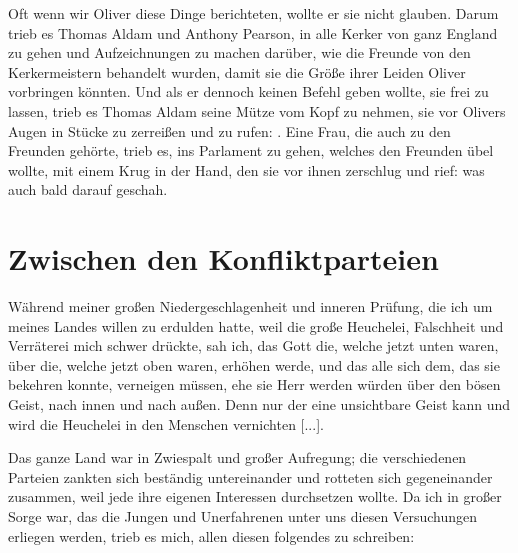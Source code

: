 Oft wenn wir Oliver diese 
Dinge berichteten, wollte er sie nicht
glauben. Darum trieb es Thomas Aldam 
und Anthony Pearson,
in alle Kerker von ganz England zu gehen und Aufzeichnungen
zu machen darüber, wie die Freunde von den Kerkermeistern
behandelt wurden, damit sie die Größe ihrer Leiden Oliver 
vorbringen könnten. Und als er dennoch keinen Befehl geben wollte,
sie frei zu lassen, trieb es Thomas Aldam seine Mütze vom Kopf
zu nehmen, sie vor Olivers Augen in Stücke zu zerreißen und zu
rufen: . Eine Frau, die auch zu den Freunden 
gehörte, trieb es, ins Parlament zu gehen, welches den Freunden
übel wollte, mit einem Krug in der Hand, den sie vor ihnen 
zerschlug und rief:  was auch bald darauf geschah. 

\section{Zwischen den Konfliktparteien}

Während meiner großen 
Niedergeschlagenheit 
und inneren Prüfung, die ich um meines Landes willen
zu erdulden hatte, weil die große Heuchelei, Falschheit und 
Verräterei mich schwer drückte, sah ich, das Gott die, welche jetzt
unten waren, über die, welche jetzt oben waren, erhöhen werde,
und das alle sich dem, das sie bekehren konnte, verneigen müssen,
ehe sie Herr werden würden über den bösen Geist, nach innen
und nach außen. Denn nur der eine unsichtbare Geist kann und
wird die Heuchelei in den Menschen vernichten [...].


Das ganze Land war in Zwiespalt und großer Aufregung;
die verschiedenen Parteien zankten sich beständig untereinander
und rotteten sich gegeneinander zusammen, weil jede ihre eigenen
Interessen durchsetzen wollte. Da ich in großer Sorge war, das
die Jungen und Unerfahrenen unter uns diesen Versuchungen 
erliegen werden, trieb es mich, allen diesen folgendes zu schreiben:

